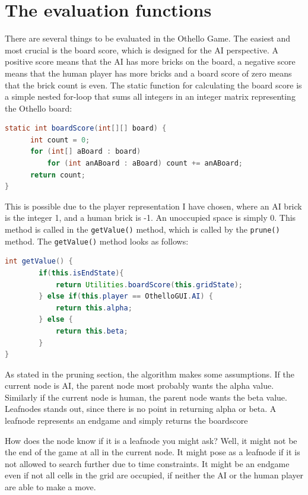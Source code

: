 \documentclass{article}
\begin{document}
\section{The evaluation functions}

There are several things to be evaluated in the Othello Game. The easiest and most crucial
is the board score, which is designed for the AI perspective. A positive score means that the
AI has more bricks on the board, a negative score means that the human player has more bricks
and a board score of zero means that the brick count is even. The static function for
calculating the board score is a simple nested for-loop that sums all integers in an integer
matrix representing the Othello board:

\begin{lstlisting}[language=Java]
static int boardScore(int[][] board) {
      int count = 0;
      for (int[] aBoard : board)
          for (int anABoard : aBoard) count += anABoard;
      return count;
}
\end{lstlisting}

This is possible due to the player representation I have chosen, where an AI brick is the
integer 1, and a human brick is -1. An unoccupied space is simply 0. This method is called
in the \verb|getValue()| method, which is called by the \verb|prune()| method.
The \verb|getValue()| method looks as follows:

\begin{lstlisting}[language=Java]
int getValue() {
        if(this.isEndState){
            return Utilities.boardScore(this.gridState);
        } else if(this.player == OthelloGUI.AI) {
            return this.alpha;
        } else {
            return this.beta;
        }
}
\end{lstlisting}

As stated in the pruning section, the algorithm makes some assumptions. If the current
node is AI, the parent node most probably wants the alpha value. Similarly if the current
node is human, the parent node wants the beta value. Leafnodes stands out, since there
is no point in returning alpha or beta. A leafnode represents an endgame and simply returns
the boardscore

How does the node know if it is a leafnode you might ask? Well, it might not be the end
of the game at all in the current node. It might pose as a leafnode if it is not allowed
to search further due to time constraints. It might be an endgame even if not all cells
in the grid are occupied, if neither the AI or the human player are able to make a move.
\end{document}
